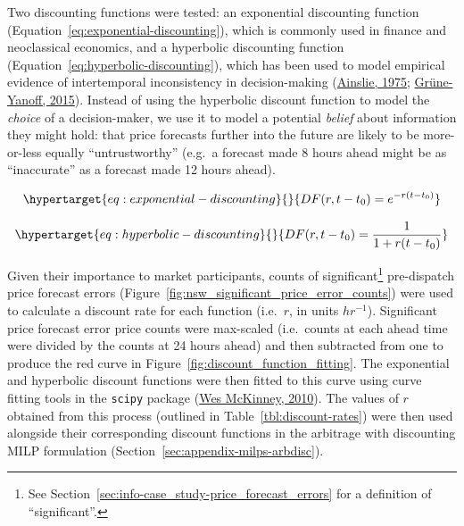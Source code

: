 \documentclass[12pt,a4paper,]{report}
\begin{document}
Two discounting functions were tested: an exponential discounting
function (Equation~\ref{eq:exponential-discounting}), which is commonly
used in finance and neoclassical economics, and a hyperbolic discounting
function (Equation~\ref{eq:hyperbolic-discounting}), which has been used
to model empirical evidence of intertemporal inconsistency in
decision-making
(\protect\hyperlink{ref-ainslieSpeciousRewardBehavioral1975}{Ainslie,
1975};
\protect\hyperlink{ref-grune-yanoffModelsTemporalDiscounting2015}{Grüne-Yanoff,
2015}). Instead of using the hyperbolic discount function to model the
\emph{choice} of a decision-maker, we use it to model a potential
\emph{belief} about information they might hold: that price forecasts
further into the future are likely to be more-or-less equally
``untrustworthy'' (e.g.~a forecast made 8 hours ahead might be as
``inaccurate'' as a forecast made 12 hours ahead).

\begin{equation}\protect\hypertarget{eq:exponential-discounting}{}{DF(r, t-t_0) = e^{-r(t-t_0)}}\label{eq:exponential-discounting}\end{equation}

\begin{equation}\protect\hypertarget{eq:hyperbolic-discounting}{}{DF(r, t-t_0) = \frac{1}{1+r(t-t_0)}}\label{eq:hyperbolic-discounting}\end{equation}

Given their importance to market participants, counts of
significant\footnote{See
  Section~\ref{sec:info-case_study-price_forecast_errors} for a
  definition of ``significant''.} pre-dispatch price forecast errors
(Figure~\ref{fig:nsw_significant_price_error_counts}) were used to
calculate a discount rate for each function (i.e.~\(r\), in units
\(hr^{-1}\)). Significant price forecast error price counts were
max-scaled (i.e.~counts at each ahead time were divided by the counts at
24 hours ahead) and then subtracted from one to produce the red curve in
Figure~\ref{fig:discount_function_fitting}. The exponential and
hyperbolic discount functions were then fitted to this curve using curve
fitting tools in the \texttt{scipy} package
(\protect\hyperlink{ref-mckinney-proc-scipy-2010}{Wes McKinney, 2010}).
The values of \(r\) obtained from this process (outlined in
Table~\ref{tbl:discount-rates}) were then used alongside their
corresponding discount functions in the arbitrage with discounting MILP
formulation (Section~\ref{sec:appendix-milps-arbdisc}).
\end{document}
